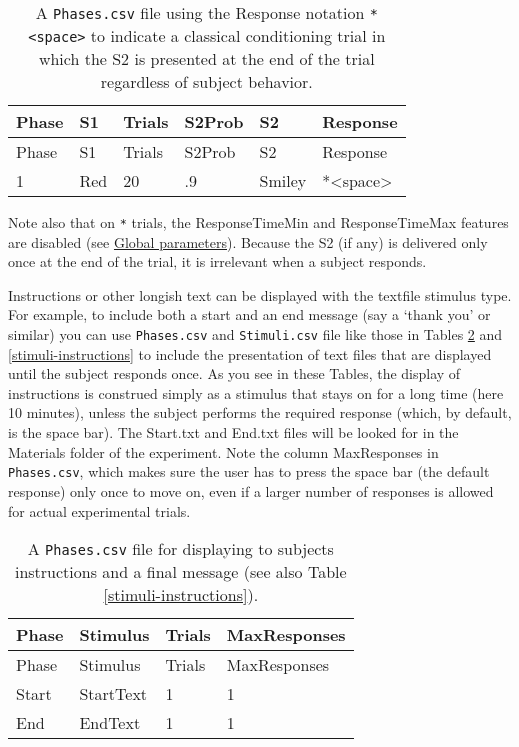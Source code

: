 \documentclass[11pt,]{article}
\begin{document}
\begin{longtable}[c]{@{}llllll@{}}
\caption{A \texttt{Phases.csv} file using the Response notation
\texttt{*\textless{}space\textgreater{}} to indicate a classical
conditioning trial in which the S2 is presented at the end of the trial
regardless of subject behavior. \label{classical}}\tabularnewline
\toprule
Phase & S1 & Trials & S2Prob & S2 & Response\tabularnewline
\midrule
\endfirsthead
\toprule
Phase & S1 & Trials & S2Prob & S2 & Response\tabularnewline
\midrule
\endhead
1 & Red & 20 & .9 & Smiley &
*\textless{}space\textgreater{}\tabularnewline
\bottomrule
\end{longtable}

Note also that on \texttt{*} trials, the ResponseTimeMin and
ResponseTimeMax features are disabled (see \hyperref[global]{Global
parameters}). Because the S2 (if any) is delivered only once at the end
of the trial, it is irrelevant when a subject responds.


Instructions or other longish text can be displayed with the textfile
stimulus type. For example, to include both a start and an end message
(say a `thank you' or similar) you can use \texttt{Phases.csv} and
\texttt{Stimuli.csv} file like those in Tables \ref{phases-instructions}
and \ref{stimuli-instructions} to include the presentation of text files
that are displayed until the subject responds once. As you see in these
Tables, the display of instructions is construed simply as a stimulus
that stays on for a long time (here 10 minutes), unless the subject
performs the required response (which, by default, is the space bar).
The Start.txt and End.txt files will be looked for in the Materials
folder of the experiment. Note the column MaxResponses in
\texttt{Phases.csv}, which makes sure the user has to press the space
bar (the default response) only once to move on, even if a larger number
of responses is allowed for actual experimental trials.

\begin{longtable}[c]{@{}llll@{}}
\caption{A \texttt{Phases.csv} file for displaying to subjects
instructions and a final message (see also Table
\ref{stimuli-instructions}). \label{phases-instructions}}\tabularnewline
\toprule
Phase & Stimulus & Trials & MaxResponses\tabularnewline
\midrule
\endfirsthead
\toprule
Phase & Stimulus & Trials & MaxResponses\tabularnewline
\midrule
\endhead
Start & StartText & 1 & 1\tabularnewline
End & EndText & 1 & 1\tabularnewline
\bottomrule
\end{longtable}
\end{document}
